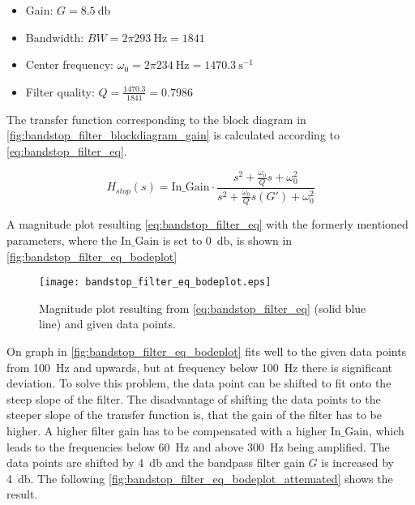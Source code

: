 \begin{itemize}
\item Gain: $G = \SI{8.5}{\decibel}$
\item Bandwidth: $BW = 2\pi \SI{293}{\hertz} = 1841$
\item Center frequency: $\omega_0 = 2\pi \SI{234}{\hertz} = \SI{1470.3}{\second ^{-1}}$
\item Filter quality: $Q = \frac{1470.3}{1841} = 0.7986$
\end{itemize}

The transfer function corresponding to the block diagram in \autoref{fig:bandstop_filter_blockdiagram_gain} is calculated according to \autoref{eq:bandstop_filter_eq}.

\begin{equation}\label{eq:bandstop_filter_eq}
H_{stop}(s) = \text{In_Gain} \cdot \frac{s^2+\frac{\omega_0}{Q}s+\omega_0^2}{s^2+\frac{\omega_0}{Q}s(G')+\omega_0^2}
\end{equation}

    \startexplain
    \stopexplain


A magnitude plot resulting \autoref{eq:bandstop_filter_eq} with the formerly mentioned parameters, where the $\text{In_Gain}$ is set to \SI{0}{\decibel}, is shown in \autoref{fig:bandstop_filter_eq_bodeplot}



\begin{figure}[H]
	\centering
	\texttt{[image: bandstop\_filter\_eq\_bodeplot.eps]}
	\caption{Magnitude plot resulting from \autoref{eq:bandstop_filter_eq} (solid blue line) and given data points.}
		\label{fig:bandstop_filter_eq_bodeplot}
\end{figure}

On graph in \autoref{fig:bandstop_filter_eq_bodeplot} fits well to the given data points from \SI{100}{\hertz} and upwards, but at frequency below \SI{100}{\hertz} there is significant deviation. To solve this problem, the data point can be shifted to fit onto the steep slope of the filter. The disadvantage of shifting the data points to the steeper slope of the transfer function is, that the gain of the filter has to be higher. A higher filter gain has to be compensated with a higher $\text{In_Gain}$, which leads to the frequencies below \SI{60}{\hertz} and above \SI{300}{\hertz} being amplified. The data points are shifted by \SI{4}{\decibel} and the bandpass filter gain $G$ is increased by \SI{4}{\decibel}. The following \autoref{fig:bandstop_filter_eq_bodeplot_attenuated} shows the result.

